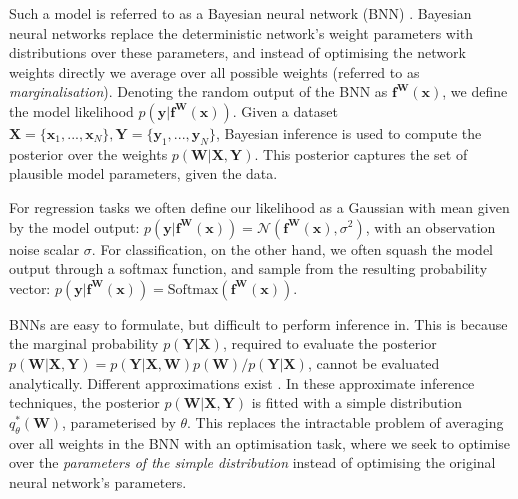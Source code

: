 \documentclass{article}
\newcommand{\softmax}{\text{Softmax}}
\newcommand{\N}{\mathcal{N}}
\newcommand{\f}{\mathbf{f}}
\newcommand{\x}{\mathbf{x}}
\newcommand{\y}{\mathbf{y}}
\newcommand{\W}{\mathbf{W}}
\newcommand{\X}{\mathbf{X}}
\newcommand{\Y}{\mathbf{Y}}
\begin{document}
Such a model is referred to as a Bayesian neural network (BNN) \citep{ denker1991transforming, mackay1992practical, neal1995bayesian}. 
Bayesian neural networks replace the deterministic network's weight parameters with distributions over these parameters, and instead of optimising the network weights directly we average over all possible weights (referred to as \textit{marginalisation}). 
Denoting the random output of the BNN as $\f^\W(\x)$, we define the model likelihood $p(\y | \f^\W(\x))$.
Given a dataset $\X=\{\x_1, ..., \x_N\}, \Y=\{\y_1, ..., \y_N\}$, Bayesian inference is used to compute the posterior over the weights $p(\W | \X, \Y)$. This posterior captures the set of plausible model parameters, given the data.

For regression tasks we often define our likelihood as a Gaussian with mean given by the model output:
$
p(\y | \f^\W(\x)) = \N(\f^\W(\x), \sigma^2)
$,
with an observation noise scalar $\sigma$. 
For classification, on the other hand, we often squash the model output through a softmax function, and sample from the resulting probability vector:
$
p(\y | \f^\W(\x)) = \softmax(\f^\W(\x))
$.

BNNs are easy to formulate, but difficult to perform inference in. This is because the marginal probability $p(\Y | \X)$, required to evaluate the posterior $p(\W | \X, \Y) = p(\Y | \X, \W)p(\W) / p(\Y | \X)$, cannot be evaluated analytically. Different approximations exist \citep{graves2011practical, blundell2015weight, hernandez2016black, Gal2016Bayesian}.
In these approximate inference techniques, the posterior $p(\W | \X, \Y)$ is fitted with a simple distribution $q_\theta^*(\W)$, parameterised by $\theta$. This replaces the intractable problem of averaging over all weights in the BNN with an optimisation task, where we seek to optimise over the \textit{parameters of the simple distribution} instead of optimising the original neural network's parameters.
\end{document}
